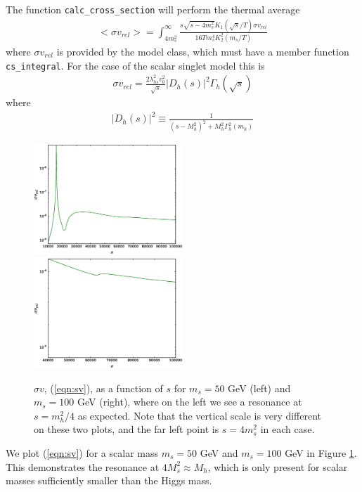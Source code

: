 The function \lstinline{calc_cross_section} will perform the thermal average \cite{Cline2013}
\begin{align}
<\!\!\sigma v_{rel}\!\!>=\int_{4m_s^2}^{\infty}\frac{s\sqrt{s-4m_s^2}K_1(\sqrt{s}/T)\sigma v_{rel}} { 16 T m_s^4K_2^2(m_s/T)} \label{thermal_av}
\end{align}
where $\sigma v_{rel}$ is provided by the model class, which must have a member function \lstinline{cs_integral}.  For the case of the scalar singlet model this is
\begin{align}
\sigma v_{rel}=\frac{2\lambda_{hs}^2v_0^2}{\sqrt{s}} |D_h(s)|^2\Gamma_h(\sqrt{s}) \label{eqn:sv}
\end{align}
where 
\begin{align}
 |D_h(s)|^2\equiv \frac{1}{ (s-M_h^2)^2+M_h^2\Gamma_h^2(m_h)}
 \end{align}
\begin{figure}
\includegraphics[width=0.5\textwidth]{resonance.eps}
\includegraphics[width=0.5\textwidth]{no_resonance.eps}
\caption{$\sigma v$, (\ref{eqn:sv}), as a function of $s$ for $m_s=50$ GeV (left) and $m_s=100$ GeV (right), where on the left we see a resonance at $s=m_h^2/4$ as expected.  Note that the vertical scale is very different on these two plots, and the far left point is $s=4m_s^2$ in each case.}\label{fig:Higgs_res}
\end{figure}

We plot (\ref{eqn:sv}) for a scalar mass $m_s=50$ GeV and $m_s=100$ GeV in Figure \ref{fig:Higgs_res}.  This demonstrates the resonance at $4M_s^2\approx M_h$, which is only present for scalar masses sufficiently smaller than the Higgs mass.

